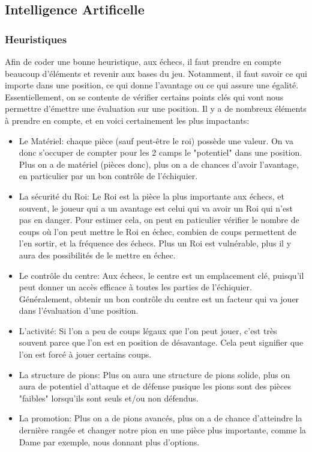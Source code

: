 \documentclass{article}
\begin{document}
\subsection{Intelligence Artificelle}
\subsubsection{Heuristiques}
Afin de coder une bonne heuristique, aux échecs, il faut prendre en compte beaucoup d'éléments et revenir aux bases du jeu.
Notamment, il faut savoir ce qui importe dans une position, ce qui donne l'avantage ou ce qui assure une égalité. Essentiellement,
on se contente de vérifier certains points clés qui vont nous permettre d'émettre une évaluation sur une position. Il y a de
nombreux éléments à prendre en compte, et en voici certainement les plus impactants:
\begin{itemize}
    \item Le Matériel: chaque pièce (sauf peut-être le roi) possède une valeur. On va donc s'occuper de compter pour les 2 camps le "potentiel"
    dans une position. Plus on a de matériel (pièces donc), plus on a de chances d'avoir l'avantage, en particulier par un bon contrôle de l'échiquier.
    \item La sécurité du Roi: Le Roi est la pièce la plus importante aux échecs, et souvent, le joueur qui a un avantage est celui qui va
    avoir un Roi qui n'est pas en danger. Pour estimer cela, on peut en paticulier vérifier le nombre de coups où l'on peut mettre le Roi en échec,
    combien de coups permettent de l'en sortir, et la fréquence des échecs. Plus un Roi est vulnérable, plus il y aura des possibilités
    de le mettre en échec.
    \item Le contrôle du centre: Aux échecs, le centre est un emplacement clé, puisqu'il peut donner un accès efficace à toutes les parties de
    l'échiquier. Généralement, obtenir un bon contrôle du centre est un facteur qui va jouer dans l'évaluation d'une position.
    \item L'activité: Si l'on a peu de coups légaux que l'on peut jouer, c'est très souvent parce que l'on est en position de désavantage. Cela peut
    signifier que l'on est forcé à jouer certains coups.
    \item La structure de pions: Plus on aura une structure de pions solide, plus on aura de potentiel d'attaque et de défense pusique les pions sont
    des pièces "faibles" lorsqu'ils sont seuls et/ou non défendus.
    \item La promotion: Plus on a de pions avancés, plus on a de chance d'atteindre la dernière rangée et changer notre pion en une pièce plus importante,
    comme la Dame par exemple, nous donnant plus d'options.
\end{itemize}
\end{document}
